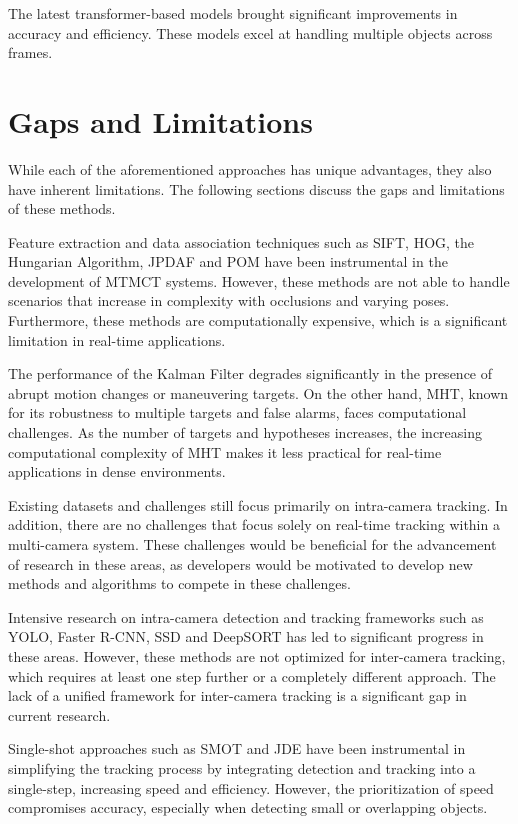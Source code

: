 The latest transformer-based models brought significant improvements in accuracy and efficiency. These models excel at handling multiple objects across frames.

\section{Gaps and Limitations}\label{sec:gaps_and_limitations}
While each of the aforementioned approaches has unique advantages, they also have inherent limitations. The following sections discuss the gaps and limitations of these methods.

Feature extraction and data association techniques such as SIFT, HOG, the Hungarian Algorithm, JPDAF and POM have been instrumental in the development of MTMCT systems. However, these methods are not able to handle scenarios that increase in complexity with occlusions and varying poses. Furthermore, these methods are computationally expensive, which is a significant limitation in real-time applications.

The performance of the Kalman Filter degrades significantly in the presence of abrupt motion changes or maneuvering targets. On the other hand, MHT, known for its robustness to multiple targets and false alarms, faces computational challenges. As the number of targets and hypotheses increases, the increasing computational complexity of MHT makes it less practical for real-time applications in dense environments.

Existing datasets and challenges still focus primarily on intra-camera tracking. In addition, there are no challenges that focus solely on real-time tracking within a multi-camera system. These challenges would be beneficial for the advancement of research in these areas, as developers would be motivated to develop new methods and algorithms to compete in these challenges.

Intensive research on intra-camera detection and tracking frameworks such as YOLO, Faster R-CNN, SSD and DeepSORT has led to significant progress in these areas. However, these methods are not optimized for inter-camera tracking, which requires at least one step further or a completely different approach. The lack of a unified framework for inter-camera tracking is a significant gap in current research.

Single-shot approaches such as SMOT and JDE have been instrumental in simplifying the tracking process by integrating detection and tracking into a single-step, increasing speed and efficiency. However, the prioritization of speed compromises accuracy, especially when detecting small or overlapping objects.

